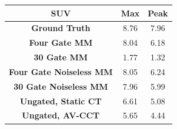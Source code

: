 \documentclass[portrait, color=UCLburgundy, margin=1cm]{uclposter}
\begin{document}
\begin{multicols}{2}
\begin{table}[H]
            \resizebox*{1.0\linewidth}{!}
            {
                \begin{tabular}{||c|cc||}
                    \hline
                    \textbf{\acrshort{SUV}}                 & \textbf{Max}  & \textbf{Peak} \\
                    \hline
                    \textbf{Ground Truth}                   & 8.76          & 7.96 \\
                    \hline
                    \textbf{Four Gate \gls{MM}}             & 8.04          & 6.18 \\
                    \textbf{30 Gate \gls{MM}}               & 1.77          & 1.32 \\
                    \hline
                    \textbf{Four Gate Noiseless \gls{MM}}   & 8.05          & 6.24 \\
                    \textbf{30 Gate Noiseless \gls{MM}}     & 7.96          & 5.99 \\
                    \hline
                    \textbf{Ungated, Static \acrshort{CT}}  & 6.61          & 5.08 \\
                    \textbf{Ungated, \gls{AV-CCT}}          & 5.65          & 4.44 \\
                    \hline
                \end{tabular}
            }
            \label{tab:suv}
        \end{table}
    \end{multicols}
\end{document}
